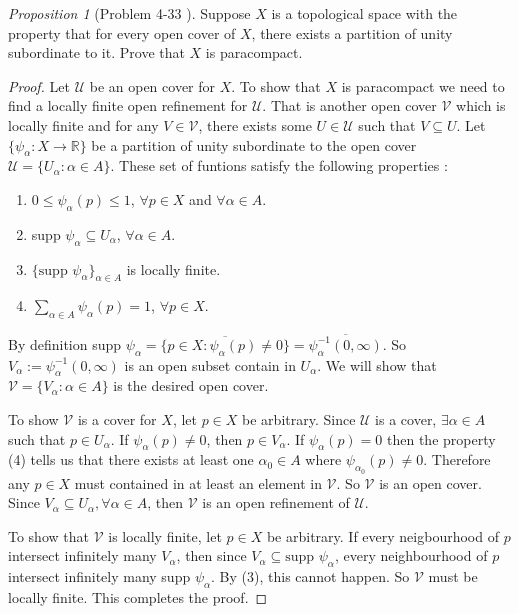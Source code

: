 \documentclass[a4paper]{article}
\theoremstyle{remark}
\newtheorem{prop}{Proposition}
\newcommand{\er}{\mathbb{R}} %
\newcommand{\subhim}{\subseteq} %
\begin{document}
\begin{prop}[Problem 4-33 \cite{LeeTM}]
	Suppose $X$ is a topological space with the property that for every open cover of $X$, there exists a partition of unity subordinate to it. Prove that $X$ is paracompact.
\end{prop}
\begin{proof}
	Let $\mathcal{U}$ be an open cover for $X$. To show that $X$ is paracompact we need to find a locally finite open refinement for $\mathcal{U}$. That is another open cover $\mathcal{V}$ which is locally finite and for any $V \in \mathcal{V}$, there exists some $U \in \mathcal{U}$ such that $V \subhim U$. Let $\{\psi_{\alpha}: X \to \er\}$ be a partition of unity subordinate to the open cover $\mathcal{U} = \{ U_{\alpha} : \alpha \in A \}$. These set of funtions satisfy the following properties :
	\begin{enumerate}[nolistsep]
		\item [(1)] $0 \leq \psi_{\alpha}(p) \leq 1$, $\forall p\in X$ and $\forall \alpha \in A$.
		\item [(2)] supp $\psi_{\alpha} \subhim U_{\alpha}$, $\forall \alpha \in A$.
		\item [(3)] $\{\text{supp }\psi_{\alpha} \}_{\alpha \in A}$ is locally finite.
		\item [(4)] $\sum_{\alpha \in A}\psi_{\alpha}(p) = 1$, $\forall p \in X$.
	\end{enumerate}
    By definition supp $\psi_{\alpha}=\overline{\{p\in X : \psi_{\alpha}(p) \neq 0\}} = \overline{\psi_{\alpha}^{-1}(0,\infty)}$. So $V_{\alpha}:=\psi_{\alpha}^{-1}(0,\infty)$ is an open subset contain in $U_{\alpha}$. We will show that $\mathcal{V} = \{V_{\alpha}: \alpha \in A\}$ is the desired open cover. 
    
    To show $\mathcal{V}$ is a cover for $X$, let $p\in X$ be arbitrary. Since $\mathcal{U}$ is a cover, $\exists \alpha \in A$ such that $p \in U_{\alpha}$. If $\psi_{\alpha}(p) \neq 0$, then $p \in V_{\alpha}$. If $\psi_{\alpha}(p) = 0$ then the property (4) tells us that there exists at least one $\alpha_0 \in A$ where $\psi_{\alpha_0}(p) \neq 0$. Therefore any $p\in X$ must contained in at least an element in $\mathcal{V}$. So $\mathcal{V}$ is an open cover. Since $V_{\alpha} \subhim U_{\alpha}, \forall \alpha \in A$, then $\mathcal{V}$ is an open refinement of $\mathcal{U}$.
    
    To show that $\mathcal{V}$ is locally finite, let $p \in X$ be arbitrary. If every neigbourhood of $p$ intersect infinitely many $V_{\alpha}$, then since $V_{\alpha} \subhim \text{supp }\psi_{\alpha}$, every neighbourhood of $p$ intersect infinitely many supp $\psi_{\alpha}$. By (3), this cannot happen. So $\mathcal{V}$ must be locally finite. This completes the proof.
\end{proof}
\end{document}
